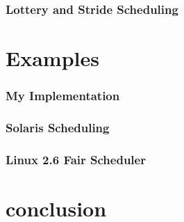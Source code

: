\documentclass{report}
\begin{document}
\section{Lottery and Stride Scheduling}

\part{Examples}

\section{My Implementation}

\section{Solaris Scheduling}

\section{Linux 2.6 Fair Scheduler}



\part{conclusion}
\end{document}
